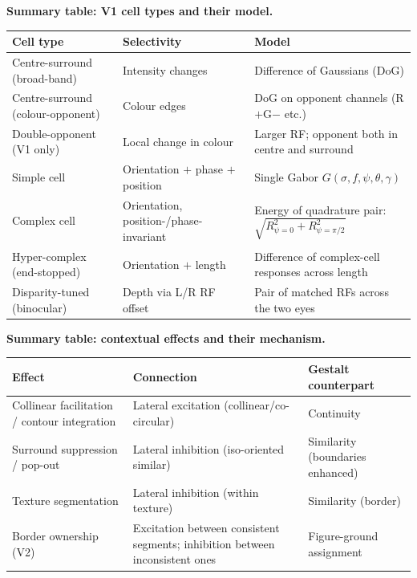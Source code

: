 \textbf{Summary table: V1 cell types and their model.}

\begin{center}
\renewcommand{\arraystretch}{1.3}
\begin{tabular}{@{} l p{4.2cm} p{6.2cm} @{}}
\toprule
\textbf{Cell type} & \textbf{Selectivity} & \textbf{Model} \\
\midrule
Centre-surround (broad-band) & Intensity changes & Difference of Gaussians (DoG) \\
Centre-surround (colour-opponent) & Colour edges & DoG on opponent channels (R$+$G$-$ etc.) \\
Double-opponent (V1 only) & Local change in colour & Larger RF; opponent both in centre and surround \\
Simple cell & Orientation $+$ phase $+$ position & Single Gabor $G(\sigma,f,\psi,\theta,\gamma)$ \\
Complex cell & Orientation, position-/phase-invariant & Energy of quadrature pair: $\sqrt{R_{\psi=0}^2 + R_{\psi=\pi/2}^2}$ \\
Hyper-complex (end-stopped) & Orientation $+$ length & Difference of complex-cell responses across length \\
Disparity-tuned (binocular) & Depth via L/R RF offset & Pair of matched RFs across the two eyes \\
\bottomrule
\end{tabular}
\end{center}

\separator

\textbf{Summary table: contextual effects and their mechanism.}

\begin{center}
\renewcommand{\arraystretch}{1.3}
\begin{tabular}{@{} l l l @{}}
\toprule
\textbf{Effect} & \textbf{Connection} & \textbf{Gestalt counterpart} \\
\midrule
Collinear facilitation / contour integration & Lateral excitation (collinear/co-circular) & Continuity \\
Surround suppression / pop-out & Lateral inhibition (iso-oriented similar) & Similarity (boundaries enhanced) \\
Texture segmentation & Lateral inhibition (within texture) & Similarity (border) \\
Border ownership (V2) & Excitation between consistent segments; inhibition between inconsistent ones & Figure-ground assignment \\
\bottomrule
\end{tabular}
\end{center}
